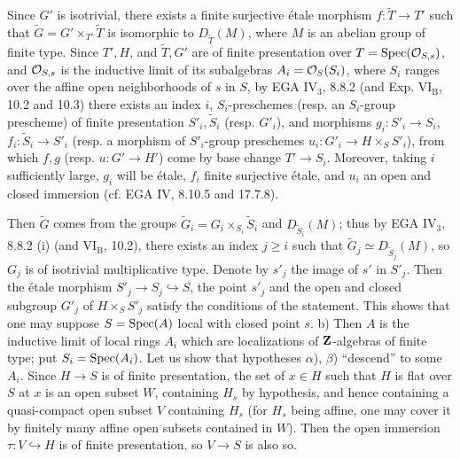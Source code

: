 Since $G'$ is isotrivial, there exists a finite surjective étale morphism $f:\widetilde T\to T'$ such that $\widetilde G=G'\times_{T'}\widetilde T$ is isomorphic to $D_{\widetilde T}(M)$, where $M$ is an abelian group of finite type. Since $T',H$, and $\widetilde T,G'$ are of finite presentation over $T=\operatorname{Spec}(\mathcal{O}_{S,s})$, and $\mathcal{O}_{S,s}$ is the inductive limit of its subalgebras $A_i=\mathcal{O}_S(S_i)$, where $S_i$ ranges over the affine open neighborhoods of $s$ in $S$, by EGA IV$_3$, 8.8.2 (and Exp. VI$_{\mathrm B}$, 10.2 and 10.3) there exists an index $i$, $S_i$-preschemes (resp. an $S_i$-group prescheme) of finite presentation $S'_i,\widetilde S_i$ (resp. $G'_i$), and morphisms $g_i:S'_i\to S_i$, $f_i:\widetilde S_i\to S'_i$ (resp. a morphism of $S'_i$-group preschemes $u_i:G'_i\to H\times_S S'_i$), from which $f,g$ (resp. $u:G'\to H'$) come by base change $T'\to S_i$. Moreover, taking $i$ sufficiently large, $g_i$ will be étale, $f_i$ finite surjective étale, and $u_i$ an open and closed immersion (cf. EGA IV, 8.10.5 and 17.7.8).

Then $\widetilde G$ comes from the groups $\widetilde G_i=G_i\times_{S_i}\widetilde S_i$ and $D_{\widetilde S_i}(M)$; thus by EGA IV$_3$, 8.8.2 (i) (and VI$_{\mathrm B}$, 10.2), there exists an index $j\geq i$ such that $\widetilde G_j\simeq D_{\widetilde S_j}(M)$, so $G_j$ is of isotrivial multiplicative type. Denote by $s'_j$ the image of $s'$ in $S'_j$. Then the étale morphism $S'_j\to S_j\hookrightarrow S$, the point $s'_j$ and the open and closed subgroup $G'_j$ of $H\times_S S'_j$ satisfy the conditions of the statement. This shows that one may suppose $S=\operatorname{Spec}(A)$ local with closed point $s$.
b) Then $A$ is the inductive limit of local rings $A_i$ which are localizations of $\mathbf{Z}$-algebras of finite type; put $S_i=\operatorname{Spec}(A_i)$. Let us show that hypotheses $\alpha$), $\beta$) ``descend'' to some $A_i$. Since $H\to S$ is of finite presentation, the set of $x\in H$ such that $H$ is flat over $S$ at $x$ is an open subset $W$, containing $H_s$ by hypothesis, and hence containing a quasi-compact open subset $V$ containing $H_s$ (for $H_s$ being affine, one may cover it by finitely many affine open subsets contained in $W$). Then the open immersion $\tau:V\hookrightarrow H$ is of finite presentation, so $V\to S$ is also so.

